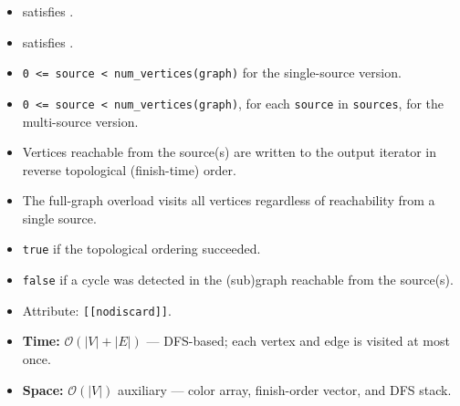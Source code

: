 \begin{itemdescr}
      \pnum\mandates
            \begin{itemize}
                  \item {} satisfies .
                  \item {} satisfies .
            \end{itemize}
      \pnum\preconditions
            \begin{itemize}
                  \item
                        \lstinline{0 <= source < num_vertices(graph)} for the single-source version.
                  \item
                        \lstinline{0 <= source < num_vertices(graph)}, for each \lstinline{source} in \lstinline{sources},
                        for the multi-source version.
            \end{itemize}
      \pnum\effects
            \begin{itemize}
                  \item
                        Vertices reachable from the source(s) are written to the output iterator in reverse
                        topological (finish-time) order.
                  \item
                        The full-graph overload visits all vertices regardless of reachability from a single source.
            \end{itemize}
      \pnum\returns
            \begin{itemize}
                  \item \lstinline{true} if the topological ordering succeeded.
                  \item \lstinline{false} if a cycle was detected in the (sub)graph reachable from the source(s).
                  \item Attribute: \lstinline{[[nodiscard]]}.
            \end{itemize}
      \pnum\complexity
            \begin{itemize}
                  \item \textbf{Time:} $\mathcal{O}(|V| + |E|)$ --- DFS-based; each vertex and edge is visited at most once.
                  \item \textbf{Space:} $\mathcal{O}(|V|)$ auxiliary --- color array, finish-order vector, and DFS stack.
            \end{itemize}

\end{itemdescr}
